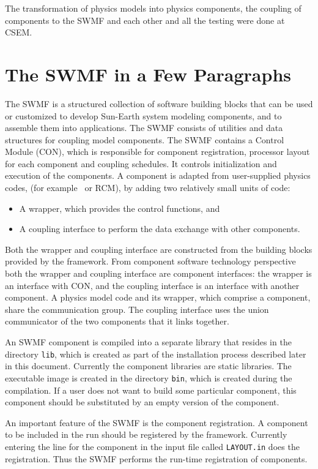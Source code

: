 The transformation of physics models into physics components,
the coupling of components to the SWMF and each other and
all the testing were done at CSEM.

\section{The SWMF in a Few Paragraphs}

The SWMF is a structured collection of software building blocks that
can be used or customized to develop Sun-Earth system modeling
components, and to assemble them into applications. The SWMF consists
of utilities and data structures for coupling model components. The
SWMF contains a Control Module (CON), which is responsible for
component registration, processor layout for each component and
coupling schedules.  It controls initialization and execution of the
components. A component is adapted from user-supplied physics codes,
(for example \BATSRUS\ or RCM), by adding two relatively small units
of code:
\begin{itemize}
\item A wrapper, which provides the control functions, and
\item A coupling interface to perform the data exchange with other
components.
\end{itemize}
Both the wrapper and coupling interface are constructed from the
building blocks provided by the framework. From 
component software technology perspective both the wrapper and
coupling interface are component interfaces: the wrapper is an
interface with CON, and the coupling interface is an interface with
another component. A physics
model code and its wrapper, which comprise a component, share the
communication group.  The coupling interface uses the union
communicator of the two components that it links together.

An SWMF component is compiled into a separate library that resides in
the directory {\tt lib}, which is created as part of the installation
process described later in this document.  Currently the component
libraries are static libraries. The executable image is created in the
directory {\tt bin}, which is created during the compilation.  If a
user does not want to build some particular component, this component
should be substituted by an empty version of the component.

An important feature of the SWMF is the component registration.  A
component to be included in the run should be registered by the
framework.  Currently entering the line for the component in the input
file called {\tt LAYOUT.in} does the registration.  Thus the SWMF
performs the run-time registration of components.

